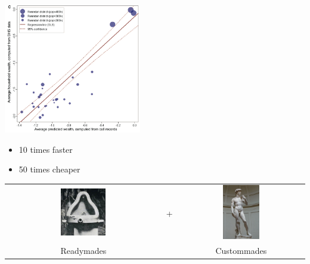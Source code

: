 \documentclass[aspectratio=169]{beamer}
\begin{document}
\begin{frame}

\begin{center}
\includegraphics[width=0.45\textwidth]{figures/blumenstock_predicting_2015_fig3c}
\end{center}

\pause

\begin{itemize}
\item 10 times faster
\item 50 times cheaper
\end{itemize}

\end{frame}
\begin{frame}

\begin{center}
\begin{tabular}{ccc}
\includegraphics[width=0.30\textwidth]{figures/duchamp_fountain} & \phantom{12} \LARGE{+} \phantom{12} & \includegraphics[width=0.30\textwidth]{figures/michelangelo_david} \\
\LARGE{Readymades} &  & \LARGE{Custommades}
\end{tabular}
\end{center}

\vfill
\vspace{0.2in}
\\

\end{frame}
\end{document}
